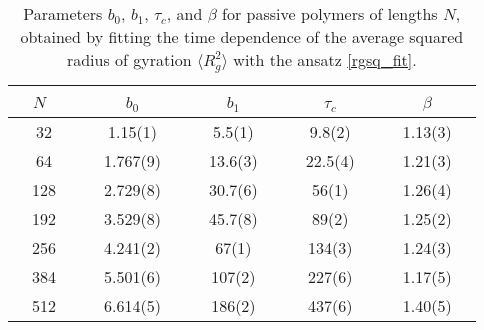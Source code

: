 \documentclass[aps,prx,reprint,showpacs,showkeys,noeprint,longbibliography]{revtex4-1} %
\begin{document}
\begin{table}[b!]
	\caption{ Parameters $b_0$, $b_1$, $\tau_c$, and $\beta$
	for passive polymers of lengths $N$, obtained by fitting the time dependence of the average squared radius of gyration  $\langle R_g^2 \rangle$ with the ansatz \eqref{rgsq_fit}.}\label{tab1}
\centering
\begin{tabular}{|c|c|c|c|c|}
\hline
~$N$~~&~~$b_0$~~&~~$b_1$~~&~~$\tau_c$~~&~~$\beta$~~\\
\hline
~~32~~&~~1.15(1)~~&~~5.5(1)~~&~~9.8(2)~~&~~1.13(3)~~\\
~~64~~&~~1.767(9)~~&~~13.6(3)~~&~~22.5(4)~~&~~1.21(3)~~\\
~~128~~&~~2.729(8)~~&~~30.7(6)~~&~~56(1)~~&~~1.26(4)~~\\
~~192~~&~~3.529(8)~~&~~45.7(8)~~&~~89(2)~~&~~1.25(2)~~\\
~~256~~&~~4.241(2)~~&~~67(1)~~&~~134(3)~~&~~1.24(3)~~\\
~~384~~&~~5.501(6)~~&~~107(2)~~&~~227(6)~~&~~1.17(5)~~\\
~~512~~&~~6.614(5)~~&~~186(2)~~&~~437(6)~~&~~1.40(5)~~\\
\hline
\end{tabular}
\end{table}
\end{document}
